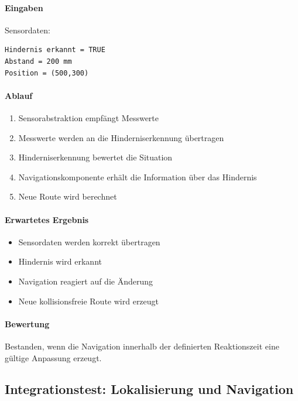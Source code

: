 \documentclass[
  a4paper,
  12pt,
  DIV=12,        %
  parskip=half,  %
  headings=small %
]{scrartcl}
\theoremstyle{definition}
\providecommand{\tightlist}{%
  \setlength{\itemsep}{0pt}\setlength{\parskip}{0pt}}
\theoremstyle{definition}
\begin{document}
\paragraph{Eingaben}\label{eingaben-9}

Sensordaten:

\begin{verbatim}
Hindernis erkannt = TRUE
Abstand = 200 mm
Position = (500,300)
\end{verbatim}

\paragraph{Ablauf}\label{ablauf-9}

\begin{enumerate}
\def\labelenumi{\arabic{enumi}.}
\tightlist
\item
  Sensorabstraktion empfängt Messwerte
\item
  Messwerte werden an die Hinderniserkennung übertragen
\item
  Hinderniserkennung bewertet die Situation
\item
  Navigationskomponente erhält die Information über das Hindernis
\item
  Neue Route wird berechnet
\end{enumerate}

\paragraph{Erwartetes Ergebnis}\label{erwartetes-ergebnis-9}

\begin{itemize}
\tightlist
\item
  Sensordaten werden korrekt übertragen
\item
  Hindernis wird erkannt
\item
  Navigation reagiert auf die Änderung
\item
  Neue kollisionsfreie Route wird erzeugt
\end{itemize}

\paragraph{Bewertung}\label{bewertung-9}

Bestanden, wenn die Navigation innerhalb der definierten Reaktionszeit
eine gültige Anpassung erzeugt.

\subsection{Integrationstest: Lokalisierung und
Navigation}\label{integrationstest-lokalisierung-und-navigation}
\end{document}

